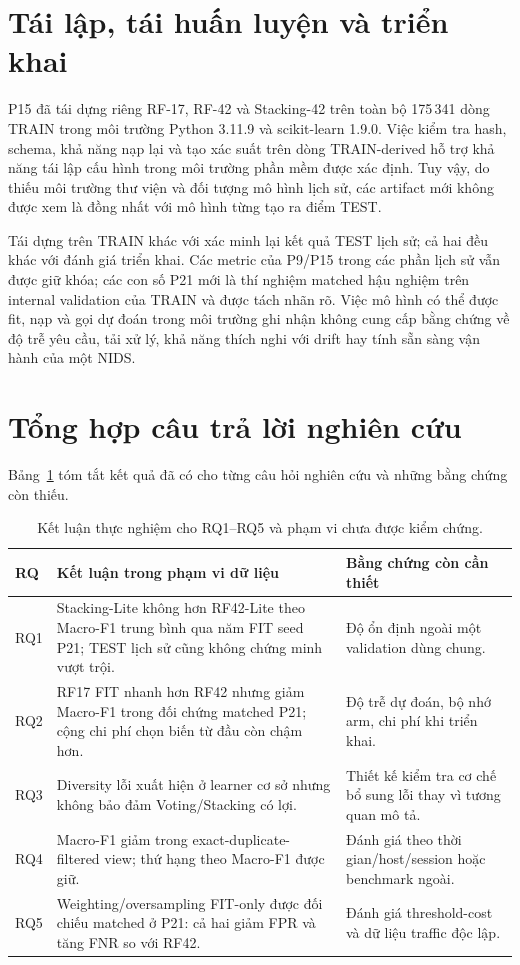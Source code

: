 \section{Tái lập, tái huấn luyện và triển khai}
\label{sec:discussion-reproducibility}

P15 đã tái dựng riêng RF-17, RF-42 và Stacking-42 trên toàn bộ 175\,341 dòng TRAIN trong môi trường Python 3.11.9 và scikit-learn 1.9.0. Việc kiểm tra hash, schema, khả năng nạp lại và tạo xác suất trên dòng TRAIN-derived hỗ trợ khả năng tái lập cấu hình trong môi trường phần mềm được xác định. Tuy vậy, do thiếu môi trường thư viện và đối tượng mô hình lịch sử, các artifact mới không được xem là đồng nhất với mô hình từng tạo ra điểm TEST.

Tái dựng trên TRAIN khác với xác minh lại kết quả TEST lịch sử; cả hai đều khác với đánh giá triển khai. Các metric của P9/P15 trong các phần lịch sử vẫn được giữ khóa; các con số P21 mới là thí nghiệm matched hậu nghiệm trên internal validation của TRAIN và được tách nhãn rõ. Việc mô hình có thể được fit, nạp và gọi dự đoán trong môi trường ghi nhận không cung cấp bằng chứng về độ trễ yêu cầu, tải xử lý, khả năng thích nghi với drift hay tính sẵn sàng vận hành của một NIDS.

\section{Tổng hợp câu trả lời nghiên cứu}
\label{sec:revision-rq-map}

Bảng~\ref{tab:rq-evidence} tóm tắt kết quả đã có cho từng câu hỏi nghiên cứu và những bằng chứng còn thiếu.

\begin{table}[htbp]
\centering
\small
\renewcommand{\arraystretch}{1.35}
\setlength{\tabcolsep}{6pt}
\caption{Kết luận thực nghiệm cho RQ1--RQ5 và phạm vi chưa được kiểm chứng.}
\label{tab:rq-evidence}
\begin{tabularx}{\linewidth}{p{0.9cm} X X}
\toprule
RQ & Kết luận trong phạm vi dữ liệu & Bằng chứng còn cần thiết\\
\midrule
RQ1 & Stacking-Lite không hơn RF42-Lite theo Macro-F1 trung bình qua năm FIT seed P21; TEST lịch sử cũng không chứng minh vượt trội. & Độ ổn định ngoài một validation dùng chung.\\
RQ2 & RF17 FIT nhanh hơn RF42 nhưng giảm Macro-F1 trong đối chứng matched P21; cộng chi phí chọn biến từ đầu còn chậm hơn. & Độ trễ dự đoán, bộ nhớ arm, chi phí khi triển khai.\\
RQ3 & Diversity lỗi xuất hiện ở learner cơ sở nhưng không bảo đảm Voting/Stacking có lợi. & Thiết kế kiểm tra cơ chế bổ sung lỗi thay vì tương quan mô tả.\\
RQ4 & Macro-F1 giảm trong exact-duplicate-filtered view; thứ hạng theo Macro-F1 được giữ. & Đánh giá theo thời gian/host/session hoặc benchmark ngoài.\\
RQ5 & Weighting/oversampling FIT-only được đối chiếu matched ở P21: cả hai giảm FPR và tăng FNR so với RF42. & Đánh giá threshold-cost và dữ liệu traffic độc lập.\\
\bottomrule
\end{tabularx}
\end{table}

